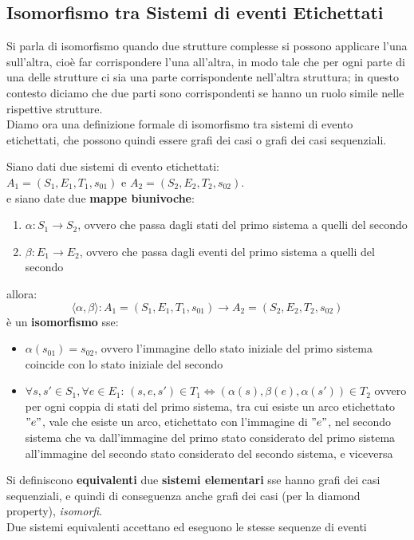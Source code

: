 \subsection{Isomorfismo tra Sistemi di eventi Etichettati}
Si parla di isomorfismo quando due strutture complesse si possono
    applicare l'una sull'altra, cioè far corrispondere l'una all'altra, in modo
    tale che per ogni parte di una delle strutture ci sia una parte
    corrispondente nell'altra struttura; in questo contesto diciamo che due
    parti sono corrispondenti se hanno un ruolo simile nelle rispettive
    strutture.\\
Diamo ora una definizione formale di isomorfismo tra sistemi di evento
etichettati, che possono quindi essere grafi dei casi o grafi dei casi
sequenziali.
\begin{definizione}
  Siano dati due sistemi di evento etichettati:\\
  $A_1 = (S_1, E_1, T_1, s_{01})$ e $A_2 = (S_2 , E_2 , T_2 , s_{02})$.\\
  e siano date due \textbf{mappe biunivoche}:
  \begin{enumerate}
    \item $\alpha:S_1\to S_2$, ovvero che passa dagli stati del primo sistema a
    quelli del secondo
    \item $\beta:E_1\to E_2$, ovvero che passa dagli eventi del primo sistema a
    quelli del secondo
  \end{enumerate}
  allora:
  \[\langle \alpha,\beta\rangle:A_1= (S_1 , E_1 , T_1 , s_{01})\to A_2 = (S_2 ,
    E_2 , T_2 , s_{02})\]
  è un \textbf{isomorfismo} sse:
  \begin{itemize}
    \item $\alpha(s_{01})=s_{02}$, ovvero l'immagine dello stato iniziale del
    primo sistema coincide con lo stato iniziale del secondo
    \item $\forall s, s'\in S_1,\forall e\in E_1:\,(s, e, s')\in T_1
    \Leftrightarrow (\alpha(s),\beta(e),\alpha(s'))\in T_2$ ovvero per ogni
    coppia di stati del primo sistema, tra cui esiste un arco etichettato $"e"$,
    vale che esiste un arco, etichettato con l'immagine di $"e"$, nel secondo
    sistema che va dall'immagine del primo stato considerato del primo sistema
    all'immagine del secondo stato considerato del secondo sistema, e viceversa
  \end{itemize}
\end{definizione} \vspace{5mm} %
\begin{definizione}
  Si definiscono \textbf{equivalenti} due \textbf{sistemi elementari} sse hanno grafi dei casi
  sequenziali, e quindi di conseguenza anche grafi dei casi (per la diamond property), \emph{isomorfi}.\\
  Due sistemi equivalenti accettano ed eseguono le stesse sequenze di eventi
\end{definizione} \vspace{5mm} %
